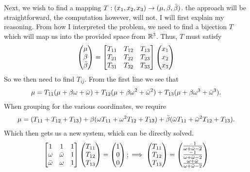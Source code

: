 \begin{solution}
\newpage
Next, we wish to find a mapping $T: (x_1, x_2, x_3) \rightarrow (\mu, \beta, \Bar{\beta})$. the approach will be straightforward, the computation however, will not. I will first explain my reasoning. From how I interpreted the problem, we need to find a bijection $T$ which will map us into the provided space from $\mathbb{R}^3$. Thus, $T$ must satisfy
\[
\begin{pmatrix}\mu\\ \beta\\ \Bar{\beta}\end{pmatrix}
= 
\begin{bmatrix}
    T_{11} &T_{12} &T_{13}\\
    T_{21} &T_{22} &T_{23}\\
    T_{31} &T_{32} &T_{33}
\end{bmatrix}
\begin{pmatrix}x_1 \\ x_2 \\x_3\end{pmatrix}
\]
So we then need to find $T_{ij}$. From the first line we see that
\[
\mu = T_{11}(\mu + \beta\omega + \Bar{\omega}) + T_{12}(\mu + \beta\omega^2 + \Bar{\omega}^2) + T_{13}(\mu + \beta\omega^3 + \Bar{\omega}^3).
\]
When grouping for the various coordinates, we require
\[
\mu = (T_{11} + T_{12} + T_{13}) + \beta(\omega T_{11} + \omega^2 T_{12} + T_{13}) + \Bar{\beta}(\Bar{\omega} T_{11} + \Bar{\omega}^2 T_{12} + T_{13}).  
\]
Which then gets us a new system, which can be directly solved.
\[
\begin{bmatrix}
    1 &1 &1 \\
    \omega &\Bar{\omega} &1\\
    \Bar{\omega} &\omega &1
\end{bmatrix}
\begin{pmatrix}T_{11} \\ T_{12} \\ T_{13}\end{pmatrix}
=
\begin{pmatrix}1 \\0 \\0 \end{pmatrix};
\implies 
\begin{pmatrix}T_{11} \\ T_{12} \\ T_{13}\end{pmatrix}
= 
\begin{pmatrix}\frac{-1}{\omega + \Bar{\omega} - 2} \\ \frac{-1}{\omega + \Bar{\omega} - 2} \\ \frac{\omega + \Bar{\omega}}{\omega + \Bar{\omega} - 2}\end{pmatrix}
\]
\end{solution}
